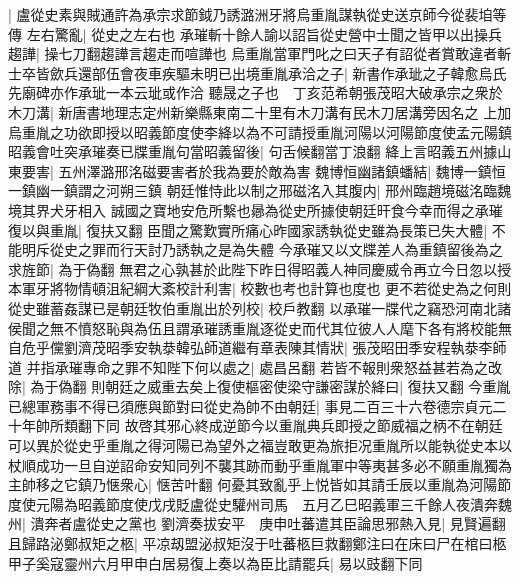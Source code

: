 |{
	盧從史素與賊通許為承宗求節鉞乃誘潞洲牙將烏重胤謀執從史送京師今從裴垍等傳}
左右驚亂|{
	從史之左右也}
承璀斬十餘人諭以詔旨從史營中士聞之皆甲以出操兵趨譁|{
	操七刀翻趨譁言趨走而喧譁也}
烏重胤當軍門叱之曰天子有詔從者賞敢違者斬士卒皆歛兵還部伍會夜車疾驅未明已出境重胤承洽之子|{
	新書作承玼之子韓愈烏氏先廟碑亦作承玼一本云玼或作洽}
聽晟之子也　丁亥范希朝張茂昭大破承宗之衆於木刀溝|{
	新唐書地理志定州新樂縣東南二十里有木刀溝有民木刀居溝旁因名之}
上加烏重胤之功欲即授以昭義節度使李絳以為不可請授重胤河陽以河陽節度使孟元陽鎮昭義會吐突承璀奏已牒重胤句當昭義留後|{
	句舌候翻當丁浪翻}
絳上言昭義五州據山東要害|{
	五州澤潞邢洺磁要害者於我為要於敵為害}
魏博恒幽諸鎮蟠結|{
	魏博一鎮恒一鎮幽一鎮謂之河朔三鎮}
朝廷惟恃此以制之邢磁洺入其腹内|{
	邢州臨趙境磁洺臨魏境其界犬牙相入}
誠國之寶地安危所繫也曏為從史所據使朝廷旰食今幸而得之承璀復以與重胤|{
	復扶又翻}
臣聞之驚歎實所痛心昨國家誘執從史雖為長策已失大體|{
	不能明斥從史之罪而行天討乃誘執之是為失體}
今承璀又以文牒差人為重鎮留後為之求旌節|{
	為于偽翻}
無君之心孰甚於此陛下昨日得昭義人神同慶威令再立今日忽以授本軍牙將物情頓沮紀綱大紊校計利害|{
	校數也考也計算也度也}
更不若從史為之何則從史雖蓄姦謀已是朝廷牧伯重胤出於列校|{
	校戶教翻}
以承璀一牒代之竊恐河南北諸侯聞之無不憤怒恥與為伍且謂承璀誘重胤逐從史而代其位彼人人麾下各有將校能無自危乎儻劉濟茂昭季安執㳟韓弘師道繼有章表陳其情狀|{
	張茂昭田季安程執㳟李師道}
并指承璀專命之罪不知陛下何以處之|{
	處昌呂翻}
若皆不報則衆怒益甚若為之改除|{
	為于偽翻}
則朝廷之威重去矣上復使樞密使梁守謙密謀於絳曰|{
	復扶又翻}
今重胤已總軍務事不得已須應與節對曰從史為帥不由朝廷|{
	事見二百三十六卷德宗貞元二十年帥所類翻下同}
故啓其邪心終成逆節今以重胤典兵即授之節威福之柄不在朝廷可以異於從史乎重胤之得河陽已為望外之福豈敢更為旅拒况重胤所以能執從史本以杖順成功一旦自逆詔命安知同列不襲其跡而動乎重胤軍中等夷甚多必不願重胤獨為主帥移之它鎮乃惬衆心|{
	惬苦叶翻}
何憂其致亂乎上悦皆如其請壬辰以重胤為河陽節度使元陽為昭義節度使戊戌貶盧從史驩州司馬　五月乙巳昭義軍三千餘人夜潰奔魏州|{
	潰奔者盧從史之黨也}
劉濟奏拔安平　庚申吐蕃遣其臣論思邪熱入見|{
	見賢遍翻}
且歸路泌鄭叔矩之柩|{
	平凉刼盟泌叔矩沒于吐蕃柩巨救翻鄭注曰在床曰尸在棺曰柩}
甲子奚寇靈州六月甲申白居易復上奏以為臣比請罷兵|{
	易以豉翻下同}


